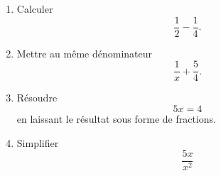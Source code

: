 
\begin{exercice}\label{exoPremiere-0019}

    \begin{multicols}{2}
    \begin{enumerate}
        \item
            Calculer
            \begin{equation}
                \frac{ 1 }{2}-\frac{1}{ 4 }.
            \end{equation}
        \item
            Mettre au même dénominateur
            \begin{equation}
                \frac{1}{ x }+\frac{ 5 }{ 4 }.
            \end{equation}
        \item
            Résoudre 
            \begin{equation}
                5x=4
            \end{equation}
            en laissant le résultat sous forme de fractions.
        \item
            Simplifier
            \begin{equation}
                \frac{ 5x }{ x^2 }
            \end{equation}
    \end{enumerate}

    \end{multicols}
\end{exercice}

